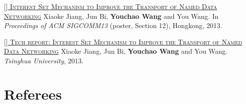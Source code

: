 \documentclass[11pt,a4paper]{moderncv}
\begin{document}
\addtocounter{counter}{1}

\href{https://ndnsim.net/2.3/ndnsim-research-papers.html}{\textsc{[] Interest Set Mechanism to Improve the Transport of Named Data Networking}}
\newline  Xiaoke Jiang, Jun Bi, \textbf{Youchao Wang} and You Wang. In \textit{Proceedings of ACM SIGCOMM13} (poster, Section 12), Hongkong, 2013. 

\addtocounter{counter}{1}

\href{http://netarchlab.tsinghua.edu.cn/~shock/THU-NetArchLab-ICN-TR-ISTSET-20130517.pdf}{\textsc{[] Tech report: Interest Set Mechanism to Improve the Transport of Named Data Networking}}
\newline  Xiaoke Jiang, Jun Bi, \textbf{Youchao Wang} and You Wang.\textit{ Tsinghua University}, 2013. 

\addtocounter{counter}{1}

\vspace*{-0.4cm}

\section{Referees}
\vspace*{-0.2cm}
\end{document}
